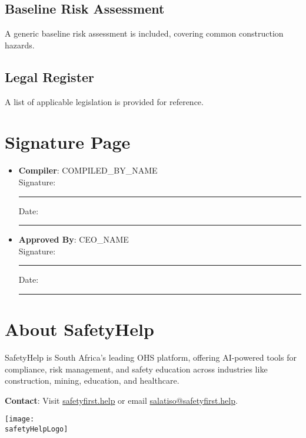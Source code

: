 \documentclass[11pt]{article}
\newcommand{\safetyHelpLogo}{/safety-plans/assets/images/logo.png}
\newcommand{\compilerName}{{{COMPILED_BY_NAME}}}
\begin{document}

\subsection{Baseline Risk Assessment}
A generic baseline risk assessment is included, covering common construction hazards.

\subsection{Legal Register}
A list of applicable legislation is provided for reference.

\section{Signature Page}
\begin{itemize}
  \item \textbf{Compiler}: \compilerName \\
    Signature: \rule{5cm}{0.4pt} \quad Date: \rule{3cm}{0.4pt}
  \item \textbf{Approved By}: {{CEO_NAME}} \\
    Signature: \rule{5cm}{0.4pt} \quad Date: \rule{3cm}{0.4pt}
\end{itemize}

\newpage
\section*{About SafetyHelp}
SafetyHelp is South Africa’s leading OHS platform, offering AI-powered tools for compliance, risk management, and safety education across industries like construction, mining, education, and healthcare.

\textbf{Contact}: Visit \href{https://safetyfirst.help}{safetyfirst.help} or email \href{mailto:salatiso@safetyfirst.help}{salatiso@safetyfirst.help}.

\vspace{2cm}
\hfill \texttt{[image: \\safetyHelpLogo]}

\label{LastPage}
\end{document}
